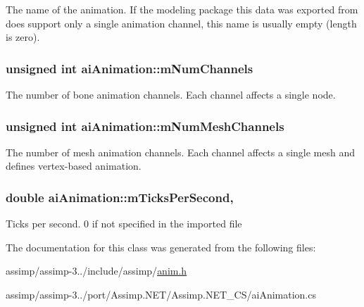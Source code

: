 The name of the animation. If the modeling package this data was exported from does support only a single animation channel, this name is usually empty (length is zero). \hypertarget{structai_animation_aebfccf9a9aefa6084566d21e8a30b7e5}{
\subsubsection[{m\+Num\+Channels}]{\setlength{\rightskip}{0pt plus 5cm}unsigned int ai\+Animation\+::m\+Num\+Channels}}\label{structai_animation_aebfccf9a9aefa6084566d21e8a30b7e5}
The number of bone animation channels. Each channel affects a single node. \hypertarget{structai_animation_ac43aacd8502020174e553501f0b6bf5f}{
\subsubsection[{m\+Num\+Mesh\+Channels}]{\setlength{\rightskip}{0pt plus 5cm}unsigned int ai\+Animation\+::m\+Num\+Mesh\+Channels}}\label{structai_animation_ac43aacd8502020174e553501f0b6bf5f}
The number of mesh animation channels. Each channel affects a single mesh and defines vertex-\/based animation. \hypertarget{structai_animation_afd26a40c3f16b6aa6e150effa3eaeab1}{
\subsubsection[{m\+Ticks\+Per\+Second}]{\setlength{\rightskip}{0pt plus 5cm}double ai\+Animation\+::m\+Ticks\+Per\+Second\hspace{0.3cm}{\ttfamily [get]}, {\ttfamily [set]}}}\label{structai_animation_afd26a40c3f16b6aa6e150effa3eaeab1}
Ticks per second. 0 if not specified in the imported file 

The documentation for this class was generated from the following files\+:\begin{DoxyCompactItemize}
\item 
assimp/assimp-\/3../include/assimp/\hyperlink{anim_8h}{anim.\+h}\item 
assimp/assimp-\/3../port/\+Assimp.\+N\+E\+T/\+Assimp.\+N\+E\+T\+\_\+\+C\+S/ai\+Animation.\+cs\end{DoxyCompactItemize}
